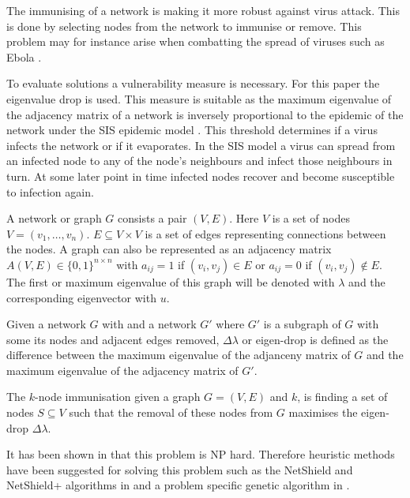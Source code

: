 \documentclass{svproc}
\begin{document}
The immunising of a network is making it more robust against virus attack. This is done by selecting nodes from the network to immunise or remove.
This problem may for instance arise when combatting the spread of viruses such as Ebola \cite{plaat}.

To evaluate solutions a vulnerability measure is necessary. For this paper the eigenvalue drop is used. This measure is suitable as the maximum eigenvalue of the adjacency matrix
of a network is inversely proportional to the epidemic of the network under the SIS epidemic model \cite{chakrabarti2008epidemic} \cite{li2013epidemic}. This threshold determines if a virus infects the network or if it evaporates. In the SIS model a virus can spread from an infected node to any of the node's neighbours and infect those neighbours in turn. At some later point in time infected nodes recover and become susceptible to infection again. 

A network or graph $G$ consists a pair $(V,E)$. Here $V$ is a set of nodes $V=(v_1, \dots, v_n)$. $E \subseteq V \times V$ is a set of edges representing connections between the nodes. A graph can also be represented as an adjacency matrix $A(V,E) \in \{0,1\}^{n \times n}$ with $a_{ij} = 1$ if $(v_i, v_j) \in E$ or $a_{ij} = 0$ if $(v_i, v_j) \notin E$. The first or maximum eigenvalue of this graph will be denoted with $\lambda$ and the corresponding eigenvector with $u$. 

\begin{definition}
Given a network $G$ with and a network $G'$ where $G'$ is a subgraph of $G$ with some its nodes and adjacent edges removed, $\Delta\lambda$ or eigen-drop is defined as the difference between the maximum eigenvalue of the adjanceny matrix of $G$ and the maximum eigenvalue of the adjacency matrix of $G'$.
\end{definition}

\begin{definition}
The $k$-node immunisation given a graph $G=(V,E)$ and $k$, is finding a set of nodes $S \subseteq V$ such that the removal of these nodes from $G$ maximises the eigen-drop $\Delta\lambda$.
\end{definition}

It has been shown in \cite{chen2016node} that this problem is NP hard. Therefore heuristic methods have been suggested for solving this problem such as the NetShield and NetShield+ algorithms in \cite{chen2016node} and a problem specific genetic algorithm in \cite{maulana2017immunization}. 
\end{document}
